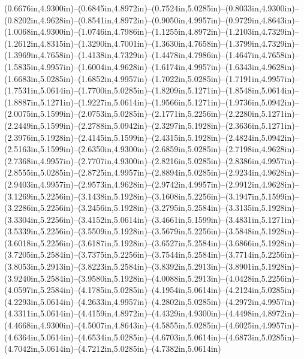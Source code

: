 (0.6676in,4.9300in)--(0.6845in,4.8972in)--(0.7524in,5.0285in)--(0.8033in,4.9300in)--(0.8202in,4.9628in)--(0.8541in,4.8972in)--(0.9050in,4.9957in)--(0.9729in,4.8643in)--(1.0068in,4.9300in)--(1.0746in,4.7986in)--(1.1255in,4.8972in)--(1.2103in,4.7329in)--(1.2612in,4.8315in)--(1.3290in,4.7001in)--(1.3630in,4.7658in)--(1.3799in,4.7329in)--(1.3969in,4.7658in)--(1.4138in,4.7329in)--(1.4478in,4.7986in)--(1.4647in,4.7658in)--(1.5835in,4.9957in)--(1.6004in,4.9628in)--(1.6174in,4.9957in)--(1.6343in,4.9628in)--(1.6683in,5.0285in)--(1.6852in,4.9957in)--(1.7022in,5.0285in)--(1.7191in,4.9957in)--(1.7531in,5.0614in)--(1.7700in,5.0285in)--(1.8209in,5.1271in)--(1.8548in,5.0614in)--(1.8887in,5.1271in)--(1.9227in,5.0614in)--(1.9566in,5.1271in)--(1.9736in,5.0942in)--(2.0075in,5.1599in)--(2.0753in,5.0285in)--(2.1771in,5.2256in)--(2.2280in,5.1271in)--(2.2449in,5.1599in)--(2.2788in,5.0942in)--(2.3297in,5.1928in)--(2.3636in,5.1271in)--(2.3976in,5.1928in)--(2.4145in,5.1599in)--(2.4315in,5.1928in)--(2.4824in,5.0942in)--(2.5163in,5.1599in)--(2.6350in,4.9300in)--(2.6859in,5.0285in)--(2.7198in,4.9628in)--(2.7368in,4.9957in)--(2.7707in,4.9300in)--(2.8216in,5.0285in)--(2.8386in,4.9957in)--(2.8555in,5.0285in)--(2.8725in,4.9957in)--(2.8894in,5.0285in)--(2.9234in,4.9628in)--(2.9403in,4.9957in)--(2.9573in,4.9628in)--(2.9742in,4.9957in)--(2.9912in,4.9628in)--(3.1269in,5.2256in)--(3.1438in,5.1928in)--(3.1608in,5.2256in)--(3.1947in,5.1599in)--(3.2286in,5.2256in)--(3.2456in,5.1928in)--(3.2795in,5.2584in)--(3.3135in,5.1928in)--(3.3304in,5.2256in)--(3.4152in,5.0614in)--(3.4661in,5.1599in)--(3.4831in,5.1271in)--(3.5339in,5.2256in)--(3.5509in,5.1928in)--(3.5679in,5.2256in)--(3.5848in,5.1928in)--(3.6018in,5.2256in)--(3.6187in,5.1928in)--(3.6527in,5.2584in)--(3.6866in,5.1928in)--(3.7205in,5.2584in)--(3.7375in,5.2256in)--(3.7544in,5.2584in)--(3.7714in,5.2256in)--(3.8053in,5.2913in)--(3.8223in,5.2584in)--(3.8392in,5.2913in)--(3.8901in,5.1928in)--(3.9240in,5.2584in)--(3.9580in,5.1928in)--(4.0088in,5.2913in)--(4.0428in,5.2256in)--(4.0597in,5.2584in)--(4.1785in,5.0285in)--(4.1954in,5.0614in)--(4.2124in,5.0285in)--(4.2293in,5.0614in)--(4.2633in,4.9957in)--(4.2802in,5.0285in)--(4.2972in,4.9957in)--(4.3311in,5.0614in)--(4.4159in,4.8972in)--(4.4329in,4.9300in)--(4.4498in,4.8972in)--(4.4668in,4.9300in)--(4.5007in,4.8643in)--(4.5855in,5.0285in)--(4.6025in,4.9957in)--(4.6364in,5.0614in)--(4.6534in,5.0285in)--(4.6703in,5.0614in)--(4.6873in,5.0285in)--(4.7042in,5.0614in)--(4.7212in,5.0285in)--(4.7382in,5.0614in) 